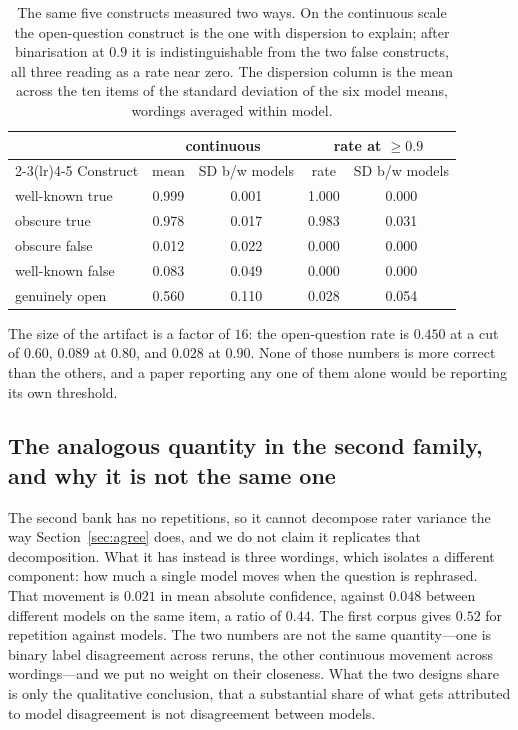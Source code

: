 \begin{table}[t]
\centering \small
\begin{tabular}{lcccc}
\toprule
& \multicolumn{2}{c}{continuous} & \multicolumn{2}{c}{rate at $\ge 0.9$} \\
\cmidrule(lr){2-3}\cmidrule(lr){4-5}
Construct & mean & SD b/w models & rate & SD b/w models \\
\midrule
well-known true  & 0.999 & 0.001 & 1.000 & 0.000 \\
obscure true     & 0.978 & 0.017 & 0.983 & 0.031 \\
obscure false    & 0.012 & 0.022 & 0.000 & 0.000 \\
well-known false & 0.083 & 0.049 & 0.000 & 0.000 \\
genuinely open   & 0.560 & 0.110 & 0.028 & 0.054 \\
\bottomrule
\end{tabular}
\caption{The same five constructs measured two ways. On the continuous scale the open-question
construct is the one with dispersion to explain; after binarisation at $0.9$ it is
indistinguishable from the two false constructs, all three reading as a rate near zero. The
dispersion column is the mean across the ten items of the standard deviation of the six model
means, wordings averaged within model.}
\label{tab:twoways}
\end{table}

The size of the artifact is a factor of $16$: the open-question rate is $0.450$ at a cut of
$0.60$, $0.089$ at $0.80$, and $0.028$ at $0.90$. None of those numbers is more correct than the
others, and a paper reporting any one of them alone would be reporting its own threshold.

\subsection{The analogous quantity in the second family, and why it is not the same one}

The second bank has no repetitions, so it cannot decompose rater variance the way
Section~\ref{sec:agree} does, and we do not claim it replicates that decomposition. What it has
instead is three wordings, which isolates a different component: how much a single model moves
when the question is rephrased. That movement is $0.021$ in mean absolute confidence, against
$0.048$ between different models on the same item, a ratio of $0.44$. The first corpus gives
$0.52$ for repetition against models. The two numbers are not the same quantity---one is binary
label disagreement across reruns, the other continuous movement across wordings---and we put no
weight on their closeness. What the two designs share is only the qualitative conclusion, that a
substantial share of what gets attributed to model disagreement is not disagreement between
models.

